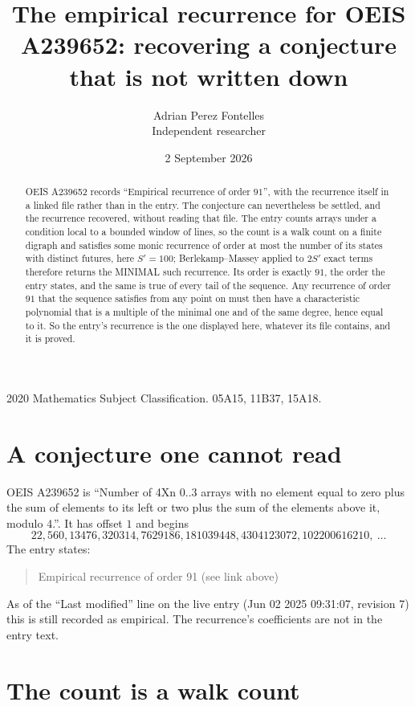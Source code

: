 \documentclass[11pt,a4paper]{article}
\title{The empirical recurrence for OEIS A239652: recovering a conjecture that is not written down}
\author{Adrian Perez Fontelles\\ \small Independent researcher}
\date{2 September 2026}
\theoremstyle{plain}
\theoremstyle{definition}
\begin{document}
\maketitle

\begin{abstract}
OEIS A239652 records ``Empirical recurrence of order $91$'', with the recurrence itself in a
linked file rather than in the entry. The conjecture can nevertheless be settled, and the
recurrence recovered, without reading that file. The entry counts arrays under a condition
local to a bounded window of lines, so the count is a walk count on a finite digraph and
satisfies some monic recurrence of order at most the number of its states with distinct
futures, here $S'=100$; Berlekamp--Massey applied to $2S'$ exact
terms therefore returns the MINIMAL such recurrence. Its order is exactly $91$, the order
the entry states, and the same is true of every tail of the sequence. Any recurrence of order
$91$ that the sequence satisfies from any point on must then have a characteristic
polynomial that is a multiple of the minimal one and of the same degree, hence equal to it. So
the entry's recurrence is the one displayed here, whatever its file contains, and it is
proved.
\end{abstract}

\noindent\small 2020 Mathematics Subject Classification. 05A15, 11B37, 15A18.\normalsize

\section{A conjecture one cannot read}

OEIS A239652 is ``Number of 4Xn 0..3 arrays with no element equal to zero plus the sum of elements to its left or two plus the sum of the elements above it, modulo 4.''. It has offset $1$ and begins
\[
22, 560, 13476, 320314, 7629186, 181039448, 4304123072, 102200616210,\ \dots
\]
The entry states:
\begin{quote}
Empirical recurrence of order 91 (see link above)
\end{quote}
As of the ``Last modified'' line on the live entry (Jun 02 2025 09:31:07, revision 7) this is still
recorded as empirical. The recurrence's coefficients are not in the entry text.

\section{The count is a walk count}
\end{document}
